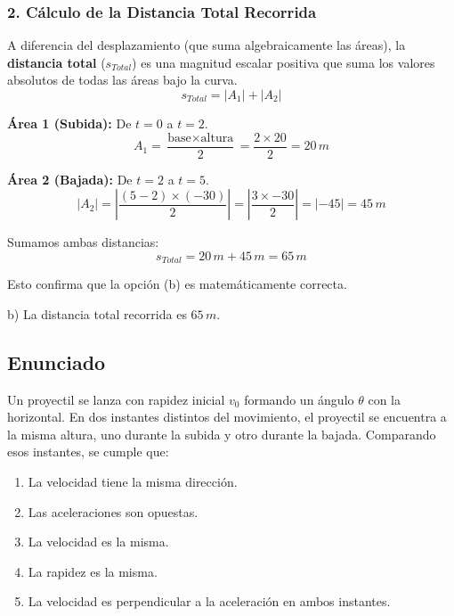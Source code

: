 \documentclass[12pt, a4paper]{article}
\begin{document}
\subsubsection*{2. Cálculo de la Distancia Total Recorrida}
A diferencia del desplazamiento (que suma algebraicamente las áreas), la \textbf{distancia total} ($s_{Total}$) es una magnitud escalar positiva que suma los valores absolutos de todas las áreas bajo la curva.
$$ s_{Total} = |A_1| + |A_2| $$

\textbf{Área 1 (Subida):} De $t=0$ a $t=2$.
$$ A_1 = \frac{\text{base} \times \text{altura}}{2} = \frac{2 \times 20}{2} = 20 \, \si{m} $$

\textbf{Área 2 (Bajada):} De $t=2$ a $t=5$.
$$ |A_2| = \left| \frac{(5-2) \times (-30)}{2} \right| = \left| \frac{3 \times -30}{2} \right| = |-45| = 45 \, \si{m} $$

Sumamos ambas distancias:
$$ s_{Total} = 20 \, \si{m} + 45 \, \si{m} = 65 \, \si{m} $$

Esto confirma que la opción (b) es matemáticamente correcta.

\begin{tcolorbox}[colback=green!5!white, colframe=green!50!black, title=Respuesta Final]
\centering \Large b) La distancia total recorrida es $65 \, \si{m}$.
\end{tcolorbox}

\newpage

\subsection*{Enunciado}
Un proyectil se lanza con rapidez inicial $v_0$ formando un ángulo $\theta$ con la horizontal. En dos instantes distintos del movimiento, el proyectil se encuentra a la misma altura, uno durante la subida y otro durante la bajada. Comparando esos instantes, se cumple que:

\begin{enumerate}[label=\alph*)]
    \item La velocidad tiene la misma dirección.
    \item Las aceleraciones son opuestas.
    \item La velocidad es la misma.
    \item La rapidez es la misma.
    \item La velocidad es perpendicular a la aceleración en ambos instantes.
\end{enumerate}
\end{document}
